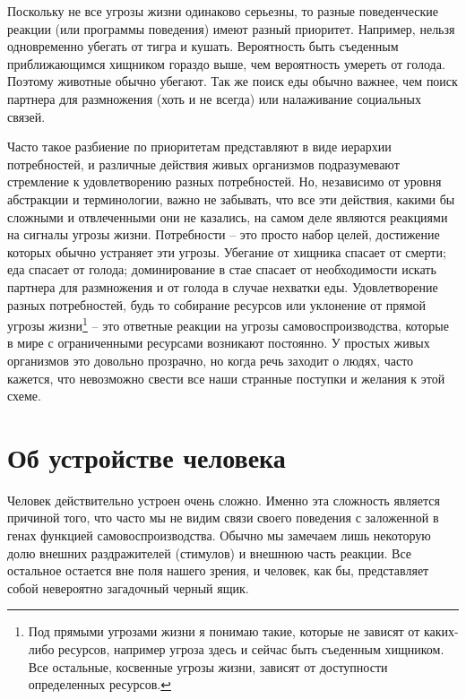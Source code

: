 \documentclass[12pt,a4paper]{report}
\begin{document}
\noindent Поскольку не все угрозы жизни одинаково серьезны, то разные поведенческие реакции (или программы поведения) имеют разный приоритет. Например, нельзя одновременно убегать от тигра и кушать. Вероятность быть съеденным приближающимся хищником гораздо выше, чем вероятность умереть от голода. Поэтому животные обычно убегают. Так же поиск еды обычно важнее, чем поиск партнера для размножения (хоть и не всегда) или налаживание социальных связей.

\noindent Часто такое разбиение по приоритетам представляют в виде иерархии потребностей, и различные действия живых организмов подразумевают стремление к удовлетворению разных потребностей. Но, независимо от уровня абстракции и терминологии, важно не забывать, что все эти действия, какими бы сложными и отвлеченными они не казались, на самом деле являются реакциями на сигналы угрозы жизни. Потребности -- это просто набор целей, достижение которых обычно устраняет эти угрозы. Убегание от хищника спасает от смерти; еда спасает от голода; доминирование в стае спасает от необходимости искать партнера для размножения и от голода в случае нехватки еды. Удовлетворение разных потребностей, будь то собирание ресурсов или уклонение от прямой угрозы жизни\footnote{Под прямыми угрозами жизни я понимаю такие, которые не зависят от каких-либо ресурсов, например угроза здесь и сейчас быть съеденным хищником. Все остальные, косвенные угрозы жизни, зависят от доступности определенных ресурсов.} -- это ответные реакции на угрозы самовоспроизводства, которые в мире с ограниченными ресурсами возникают постоянно. У простых живых организмов это довольно прозрачно, но когда речь заходит о людях, часто кажется, что невозможно свести все наши странные поступки и желания к этой схеме.

\section*{Об устройстве человека}

Человек действительно устроен очень сложно. Именно эта сложность является причиной того, что часто мы не видим связи своего поведения с заложенной в генах функцией самовоспроизводства. Обычно мы замечаем лишь некоторую долю внешних раздражителей (стимулов) и внешнюю часть реакции. Все остальное остается вне поля нашего зрения, и человек, как бы, представляет собой невероятно загадочный черный ящик.
\end{document}
